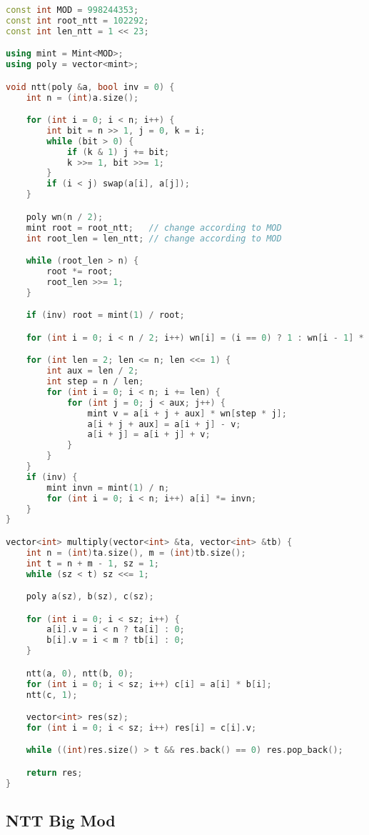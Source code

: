 \documentclass[10pt, a4paper, oneside]{book}
\begin{document}
\begin{lstlisting}[language=C++]
const int MOD = 998244353;
const int root_ntt = 102292;
const int len_ntt = 1 << 23;

using mint = Mint<MOD>;
using poly = vector<mint>;

void ntt(poly &a, bool inv = 0) {
    int n = (int)a.size();

    for (int i = 0; i < n; i++) {
        int bit = n >> 1, j = 0, k = i;
        while (bit > 0) {
            if (k & 1) j += bit;
            k >>= 1, bit >>= 1;
        }
        if (i < j) swap(a[i], a[j]);
    }

    poly wn(n / 2);
    mint root = root_ntt;   // change according to MOD
    int root_len = len_ntt; // change according to MOD

    while (root_len > n) {
        root *= root;
        root_len >>= 1;
    }

    if (inv) root = mint(1) / root;

    for (int i = 0; i < n / 2; i++) wn[i] = (i == 0) ? 1 : wn[i - 1] * root;

    for (int len = 2; len <= n; len <<= 1) {
        int aux = len / 2;
        int step = n / len;
        for (int i = 0; i < n; i += len) {
            for (int j = 0; j < aux; j++) {
                mint v = a[i + j + aux] * wn[step * j];
                a[i + j + aux] = a[i + j] - v;
                a[i + j] = a[i + j] + v;
            }
        }
    }
    if (inv) {
        mint invn = mint(1) / n;
        for (int i = 0; i < n; i++) a[i] *= invn;
    }
}

vector<int> multiply(vector<int> &ta, vector<int> &tb) {
    int n = (int)ta.size(), m = (int)tb.size();
    int t = n + m - 1, sz = 1;
    while (sz < t) sz <<= 1;

    poly a(sz), b(sz), c(sz);

    for (int i = 0; i < sz; i++) {
        a[i].v = i < n ? ta[i] : 0;
        b[i].v = i < m ? tb[i] : 0;
    }

    ntt(a, 0), ntt(b, 0);
    for (int i = 0; i < sz; i++) c[i] = a[i] * b[i];
    ntt(c, 1);

    vector<int> res(sz);
    for (int i = 0; i < sz; i++) res[i] = c[i].v;

    while ((int)res.size() > t && res.back() == 0) res.pop_back();

    return res;
}\end{lstlisting}
\hfill

\subsection{NTT Big Mod}
\end{document}
